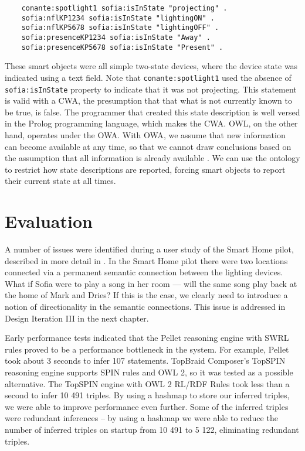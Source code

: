 \begin{verbatim}
	conante:spotlight1 sofia:isInState "projecting" .
	sofia:nflKP1234 sofia:isInState "lightingON" .
	sofia:nflKP5678 sofia:isInState "lightingOFF" .
	sofia:presenceKP1234 sofia:isInState "Away" .
	sofia:presenceKP5678 sofia:isInState "Present" .
\end{verbatim}

These smart objects were all simple two-state devices, where the device state was indicated using a text field. Note that \texttt{conante:spotlight1} used the absence of \texttt{sofia:isInState} property to indicate that it was not projecting. This statement is valid with a \ac{CWA}, the presumption that that what is not currently known to be true, is false. The programmer that created this state description is well versed in the Prolog programming language, which makes the \ac{CWA}. \ac{OWL}, on the other hand, operates under the \ac{OWA}. With \ac{OWA}, we assume that new information can become available at any time, so that we cannot draw conclusions based on the assumption that all information is already available \cite{Allemang2011}. We can use the ontology to restrict how state descriptions are reported, forcing smart objects to report their current state at all times.




\section{Evaluation}
\label{D2Evaluation}
A number of issues were identified during a user study of the Smart Home pilot, described in more detail in \cite{VanderVlist2012a}. In the Smart Home pilot there were two locations connected via a permanent semantic connection between the lighting devices. What if Sofia were to play a song in her room --- will the same song play back at the home of Mark and Dries? If this is the case, we clearly need to introduce a notion of directionality in the semantic connections. This issue is addressed in Design Iteration III in the next chapter.

Early performance tests indicated that the Pellet reasoning engine with \ac{SWRL} rules proved to be a performance bottleneck in the system. For example, Pellet took about 3 seconds to infer 107 statements. TopBraid Composer's TopSPIN reasoning engine supports \ac{SPIN} rules and \ac{OWL} 2, so it was tested as a possible alternative. The TopSPIN engine with OWL 2 RL/RDF Rules took less than a second to infer 10 491 triples. By using a hashmap to store our inferred triples, we were able to improve performance even further. Some of the inferred triples were redundant inferences -- by using a hashmap we were able to reduce the number of inferred triples on startup from 10 491 to 5 122, eliminating redundant triples.

